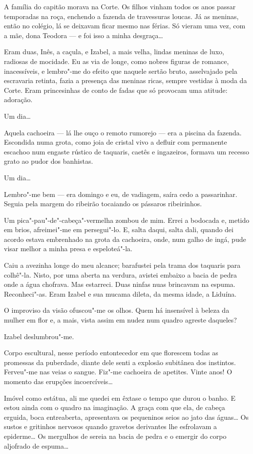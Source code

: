 A família do capitão morava na Corte. Os filhos vinham todos os anos
passar temporadas na roça, enchendo a fazenda de travessuras loucas. Já
as meninas, então no colégio, lá se deixavam ficar mesmo nas férias. Só
vieram uma vez, com a mãe, dona Teodora --- e foi isso a minha
desgraça\ldots{}

Eram duas, Inês, a caçula, e Izabel, a mais velha, lindas meninas de
luxo, radiosas de mocidade. Eu as via de longe, como nobres figuras de
romance, inacessíveis, e lembro"-me do efeito que naquele sertão bruto,
asselvajado pela escravaria retinta, fazia a presença das meninas ricas,
sempre vestidas à moda da Corte. Eram princesinhas de conto de fadas que
só provocam uma atitude: adoração.

Um dia\ldots{}

Aquela cachoeira --- lá lhe ouço o remoto rumorejo --- era a piscina da
fazenda. Escondida numa grota, como joia de cristal vivo a defluir com
permanente escachoo num engaste rústico de taquaris, caetês e
ingazeiros, formava um recesso grato ao pudor dos banhistas.

Um dia\ldots{}

Lembro"-me bem --- era domingo e eu, de vadiagem, saíra cedo a
passarinhar. Seguia pela margem do ribeirão tocaiando os pássaros
ribeirinhos.

Um pica"-pau"-de"-cabeça"-vermelha zombou de mim. Errei a bodocada e, metido
em brios, afreimei"-me em persegui"-lo. E, salta daqui, salta dali, quando
dei acordo estava embrenhado na grota da cachoeira, onde, num galho de
ingá, pude visar melhor a minha presa e espeloteá"-la.

Caiu a avezinha longe do meu alcance; barafustei pela trama dos taquaris
para colhê"-la. Nisto, por uma aberta na verdura, avistei embaixo a bacia
de pedra onde a água chofrava. Mas estarreci. Duas ninfas nuas brincavam
na espuma. Reconheci"-as. Eram Izabel e sua mucama dileta, da mesma
idade, a Liduína.

O improviso da visão ofuscou"-me os olhos. Quem há insensível à beleza da
mulher em flor e, a mais, vista assim em nudez num quadro agreste
daqueles?

Izabel deslumbrou"-me.

Corpo escultural, nesse período entontecedor em que florescem todas as
promessas da puberdade, diante dele senti a explosão subitânea dos
instintos. Ferveu"-me nas veias o sangue. Fiz"-me cachoeira de apetites.
Vinte anos! O momento das erupções incoercíveis\ldots{}

Imóvel como estátua, ali me quedei em êxtase o tempo que durou o banho.
E estou ainda com o quadro na imaginação. A graça com que ela, de cabeça
erguida, boca entreaberta, apresentava os pequeninos seios ao jato das
águas\ldots{} Os sustos e gritinhos nervosos quando gravetos derivantes lhe
esfrolavam a epiderme\ldots{} Os mergulhos de sereia na bacia de pedra e o
emergir do corpo aljofrado de espuma\ldots{}

